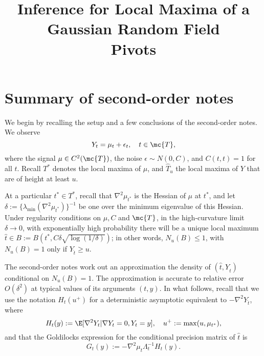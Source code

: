 \documentclass{article}
\title{ {\bf Inference for Local Maxima of a Gaussian Random Field} \\ Pivots}
\begin{document}
	
\maketitle
\RaggedRight

\section{Summary of second-order notes}
We begin by recalling the setup and a few conclusions of the second-order notes. We observe
\begin{equation}
	Y_t = \mu_t + \epsilon_t, \quad {t \in \mc{T}},
\end{equation}
where the signal $\mu \in C^2(\mc{T})$, the noise $\epsilon \sim N(0,C)$, and $C(t,t) = 1$ for all $t$. Recall $T^*$ denotes the local maxima of $\mu$, and $\hat{T}_u$ the local maxima of $Y$ that are of height at least $u$. 

At a particular $t^* \in T^*$, recall that $\nabla^2 \mu_{t^*}$ is the Hessian of $\mu$ at $t^*$, and let $\delta := \{\lambda_{\min}(\nabla^2\mu_{t^*})\}^{-1}$ be one over the minimum eigenvalue of this Hessian. Under regularity conditions on $\mu,C$ and $\mc{T}$, in the high-curvature limit $\delta \to 0$, with exponentially high probability there will be a unique local maximum $\hat{t} \in B := B(t^*,C\delta\sqrt{\log(1/\delta)})$; in other words, $N_u(B) \leq 1$, with $N_u(B) = 1$ only if $Y_{\hat{t}} \geq u$. 

The second-order notes work out an approximation the density of $(\hat{t},Y_{\hat{t}})$ conditional on $N_u(B) = 1$. The approximation is accurate to relative error $O(\delta^2)$ at typical values of its arguments $(t,y)$. In what follows, recall that we use the notation $H_t(u^+)$ for a deterministic asymptotic equivalent to $-\nabla^2 Y_{\hat{t}}$, where
\begin{equation}
	H_t(y) := \E[\nabla^2 Y_t|\nabla Y_t = 0, Y_t = y], \quad u^{+} := \max(u,\mu_{t^*}),
\end{equation}
and that the Goldilocks expression for the conditional precision matrix of $\hat{t}$ is
\begin{equation}
	G_t(y) := -\nabla^2 \mu_t \Lambda_t^{-1} H_t(y).
\end{equation}
\end{document}
